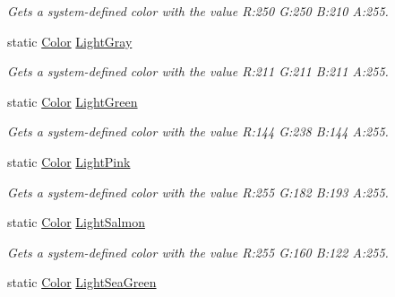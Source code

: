 \begin{DoxyCompactItemize}
\begin{DoxyCompactList}\small\item\em Gets a system-\/defined color with the value R\+:250 G\+:250 B\+:210 A\+:255.\end{DoxyCompactList}\item 
static \hyperlink{structMicrosoft_1_1Xna_1_1Framework_1_1Color}{Color} \hyperlink{structMicrosoft_1_1Xna_1_1Framework_1_1Color_a6ba6cf04da4bd4f9296afa5ade02ca12}{Light\+Gray}
\begin{DoxyCompactList}\small\item\em Gets a system-\/defined color with the value R\+:211 G\+:211 B\+:211 A\+:255.\end{DoxyCompactList}\item 
static \hyperlink{structMicrosoft_1_1Xna_1_1Framework_1_1Color}{Color} \hyperlink{structMicrosoft_1_1Xna_1_1Framework_1_1Color_a6391f3062b560628b1fc1cbcf6a60229}{Light\+Green}
\begin{DoxyCompactList}\small\item\em Gets a system-\/defined color with the value R\+:144 G\+:238 B\+:144 A\+:255.\end{DoxyCompactList}\item 
static \hyperlink{structMicrosoft_1_1Xna_1_1Framework_1_1Color}{Color} \hyperlink{structMicrosoft_1_1Xna_1_1Framework_1_1Color_af9cb1b8803753191cbe22f4f8744627a}{Light\+Pink}
\begin{DoxyCompactList}\small\item\em Gets a system-\/defined color with the value R\+:255 G\+:182 B\+:193 A\+:255.\end{DoxyCompactList}\item 
static \hyperlink{structMicrosoft_1_1Xna_1_1Framework_1_1Color}{Color} \hyperlink{structMicrosoft_1_1Xna_1_1Framework_1_1Color_aeed458990c50db439c0685772ed98a9b}{Light\+Salmon}
\begin{DoxyCompactList}\small\item\em Gets a system-\/defined color with the value R\+:255 G\+:160 B\+:122 A\+:255.\end{DoxyCompactList}\item 
static \hyperlink{structMicrosoft_1_1Xna_1_1Framework_1_1Color}{Color} \hyperlink{structMicrosoft_1_1Xna_1_1Framework_1_1Color_aaeb92f9e9df177ff74fd591820828f20}{Light\+Sea\+Green}

\end{DoxyCompactItemize}
